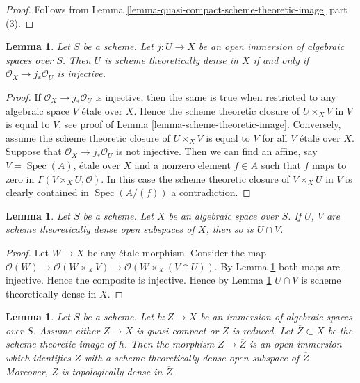 \documentclass{stacks-project}
\theoremstyle{plain}
\newtheorem{lemma}[subsection]{Lemma}
\theoremstyle{definition}
\theoremstyle{remark}
\numberwithin{equation}{subsection}
\def\Spec{\mathop{\mathrm{Spec}}}
\begin{document}
\begin{proof}
Follows from Lemma \ref{lemma-quasi-compact-scheme-theoretic-image} part (3).
\end{proof}

\begin{lemma}
\label{lemma-characterize-scheme-theoretically-dense}
Let $S$ be a scheme.
Let $j : U \to X$ be an open immersion of algebraic spaces over $S$.
Then $U$ is scheme theoretically dense in $X$ if and only if
$\mathcal{O}_X \to j_*\mathcal{O}_U$ is injective.
\end{lemma}

\begin{proof}
If $\mathcal{O}_X \to j_*\mathcal{O}_U$ is injective,
then the same is true when restricted to any
algebraic space $V$ \'etale over $X$.
Hence the scheme theoretic closure of $U \times_X V$ in $V$
is equal to $V$, see proof of
Lemma \ref{lemma-scheme-theoretic-image}.
Conversely, assume the scheme theoretic
closure of $U \times_X V$ is equal to $V$ for all $V$ \'etale over $X$.
Suppose that $\mathcal{O}_X \to j_*\mathcal{O}_U$ is not injective.
Then we can find an affine, say $V = \Spec(A)$, \'etale over $X$
and a nonzero element $f \in A$ such that $f$ maps to zero in
$\Gamma(V \times_X U, \mathcal{O})$. In this case the scheme theoretic
closure of $V \times_X U$ in $V$ is clearly contained in $\Spec(A/(f))$
a contradiction.
\end{proof}

\begin{lemma}
\label{lemma-intersection-scheme-theoretically-dense}
Let $S$ be a scheme. Let $X$ be an algebraic space over $S$.
If $U$, $V$ are scheme theoretically dense
open subspaces of $X$, then so is $U \cap V$.
\end{lemma}

\begin{proof}
Let $W \to X$ be any \'etale morphism. Consider the map
$\mathcal{O}(W) \to \mathcal{O}(W \times_X V)
\to \mathcal{O}(W \times_X (V \cap U))$.
By Lemma \ref{lemma-characterize-scheme-theoretically-dense}
both maps are injective. Hence the composite is injective.
Hence by Lemma \ref{lemma-characterize-scheme-theoretically-dense}
$U \cap V$ is scheme theoretically dense in $X$.
\end{proof}

\begin{lemma}
\label{lemma-quasi-compact-immersion}
Let $S$ be a scheme. Let $h : Z \to X$ be an immersion of algebraic spaces
over $S$. Assume either $Z \to X$ is quasi-compact or $Z$ is reduced.
Let $\overline{Z} \subset X$ be the scheme theoretic image of $h$.
Then the morphism $Z \to \overline{Z}$ is an open immersion
which identifies $Z$ with a scheme theoretically dense open
subspace of $\overline{Z}$. Moreover, $Z$ is topologically
dense in $\overline{Z}$.
\end{lemma}
\end{document}
